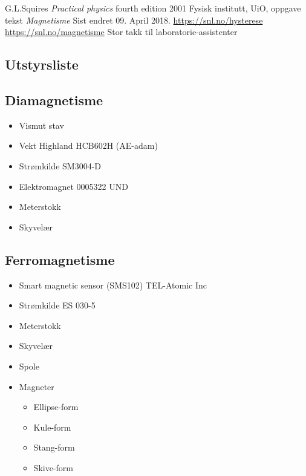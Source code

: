 \documentclass[norsk,a4paper,12pt]{article}
\begin{document}
\begin{thebibliography}{}
	G.L.Squires
	\textit{Practical physics}
	fourth edition
	2001
	Fysisk institutt, UiO, oppgave tekst
	\textit{Magnetisme}
	Sist endret 09. April 2018.
	\url{https://snl.no/hysterese}
	\url{https://snl.no/magnetisme}
	Stor takk til laboratorie-assistenter
\end{thebibliography}
\newpage
\begin{appendices}
\appendix
\section{Utstyrsliste}
\subsection{Diamagnetisme}
\begin{multicols}{2}
\begin{itemize}
  	\item Vismut stav
	\item Vekt Highland HCB602H (AE-adam)
	\item Strømkilde SM3004-D
	\item Elektromagnet 0005322 UND
	\item Meterstokk
	\item Skyvelær
\end{itemize}
\end{multicols}
\subsection{Ferromagnetisme}
\begin{multicols}{2}
\begin{itemize}
  	\item Smart magnetic sensor (SMS102) TEL-Atomic Inc
	\item Strømkilde ES 030-5
	\item Meterstokk
	\item Skyvelær
	\item Spole
	\item Magneter
		\begin{itemize}
		\item Ellipse-form
		\item Kule-form
		\item Stang-form
		\item Skive-form
		\end{itemize}
\end{itemize}
\end{multicols}

\end{appendices}
\end{document}
